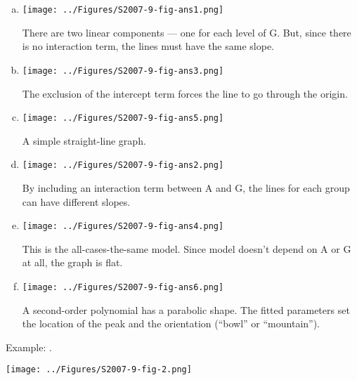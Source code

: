 \begin{enumerate}[(a)]
\item {}

\begin{AnswerText}
\texttt{[image: ../Figures/S2007-9-fig-ans1.png]} 

There are two linear components --- one for each level of G.  But, since there is no interaction term, the lines must have the same slope. 
\end{AnswerText}

\item {}
\begin{AnswerText}
\texttt{[image: ../Figures/S2007-9-fig-ans3.png]} 

The exclusion of the intercept term forces the line to go through the origin.
\end{AnswerText}

\item {}
\begin{AnswerText}
\texttt{[image: ../Figures/S2007-9-fig-ans5.png]} 

A simple straight-line graph.
\end{AnswerText}

\item {}
\begin{AnswerText}
\texttt{[image: ../Figures/S2007-9-fig-ans2.png]}

By including an interaction term between A and G, the lines for each group can have different slopes.
\end{AnswerText}

\item {}
\begin{AnswerText}
\texttt{[image: ../Figures/S2007-9-fig-ans4.png]}

This is the all-cases-the-same model.  Since model doesn't depend on A or G at all, the graph is flat.
\end{AnswerText}

\item {}
\begin{AnswerText}
\texttt{[image: ../Figures/S2007-9-fig-ans6.png]}

A second-order polynomial has a parabolic shape.  The fitted parameters set the location of the peak and the orientation (``bowl'' or ``mountain'').
\end{AnswerText}
\end{enumerate}
\bigskip

\noindent Example: .

\centerline{\texttt{[image: ../Figures/S2007-9-fig-2.png]}}



